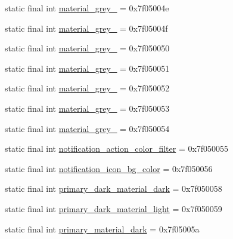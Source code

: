 \begin{DoxyCompactItemize}
\item 
static final int \mbox{\hyperlink{classcom_1_1synnapps_1_1carouselview_1_1_r_1_1color_aac762d7f67a9e3ac7062195445823656}{material\+\_\+grey\+\_}} = 0x7f05004e
\item 
static final int \mbox{\hyperlink{classcom_1_1synnapps_1_1carouselview_1_1_r_1_1color_a85322ccbc9f045b012581f1c775755e1}{material\+\_\+grey\+\_}} = 0x7f05004f
\item 
static final int \mbox{\hyperlink{classcom_1_1synnapps_1_1carouselview_1_1_r_1_1color_ad3bd8c1a22f819cb6c899efdfe3529aa}{material\+\_\+grey\+\_}} = 0x7f050050
\item 
static final int \mbox{\hyperlink{classcom_1_1synnapps_1_1carouselview_1_1_r_1_1color_a2253fb5d7ea13b05793f3b19b69f926a}{material\+\_\+grey\+\_}} = 0x7f050051
\item 
static final int \mbox{\hyperlink{classcom_1_1synnapps_1_1carouselview_1_1_r_1_1color_ae4ae561fb563e5d69a72e1757446b375}{material\+\_\+grey\+\_}} = 0x7f050052
\item 
static final int \mbox{\hyperlink{classcom_1_1synnapps_1_1carouselview_1_1_r_1_1color_a88932a1d18962a3ff3fdf1c39ca66920}{material\+\_\+grey\+\_}} = 0x7f050053
\item 
static final int \mbox{\hyperlink{classcom_1_1synnapps_1_1carouselview_1_1_r_1_1color_ae7f2a29304825bc4c616a5a736360194}{material\+\_\+grey\+\_}} = 0x7f050054
\item 
static final int \mbox{\hyperlink{classcom_1_1synnapps_1_1carouselview_1_1_r_1_1color_a0ce014e338996707b15aa4f0ae89be2b}{notification\+\_\+action\+\_\+color\+\_\+filter}} = 0x7f050055
\item 
static final int \mbox{\hyperlink{classcom_1_1synnapps_1_1carouselview_1_1_r_1_1color_ae7f198e6eb936bebaef1262a6fc68364}{notification\+\_\+icon\+\_\+bg\+\_\+color}} = 0x7f050056
\item 
static final int \mbox{\hyperlink{classcom_1_1synnapps_1_1carouselview_1_1_r_1_1color_ad5959b4521091b98c888ad01783a5c7c}{primary\+\_\+dark\+\_\+material\+\_\+dark}} = 0x7f050058
\item 
static final int \mbox{\hyperlink{classcom_1_1synnapps_1_1carouselview_1_1_r_1_1color_af747af278e90be4c136c8f06d22e5938}{primary\+\_\+dark\+\_\+material\+\_\+light}} = 0x7f050059
\item 
static final int \mbox{\hyperlink{classcom_1_1synnapps_1_1carouselview_1_1_r_1_1color_a25e89983b25af715d30faddf461a159d}{primary\+\_\+material\+\_\+dark}} = 0x7f05005a
\item 

\end{DoxyCompactItemize}
